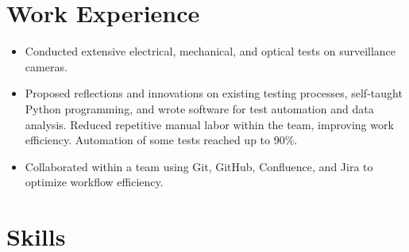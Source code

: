 \documentclass[11pt,a4paper,sans]{moderncv}
\begin{document}
\vspace{-0.2cm} 

\section{Work Experience}
{
    \begin{itemize}
    \item Conducted extensive electrical, mechanical, and optical tests on surveillance cameras.
    \item Proposed reflections and innovations on existing testing processes, self-taught Python programming, and wrote software for test automation and data analysis. Reduced repetitive manual labor within the team, improving work efficiency. Automation of some tests reached up to 90\%.
    \item Collaborated within a team using Git, GitHub, Confluence, and Jira to optimize workflow efficiency.
    \end{itemize}
}
\vspace{-0.3cm} 

\section{Skills}
\end{document}
